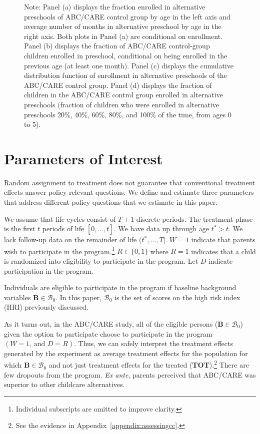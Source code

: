 \begin{figure}
\footnotesize \justify
Note: Panel (a) displays the fraction enrolled in alternative preschools of ABC/CARE control group by age in the left axis and average number of months in alternative preschool by age in the right axis. Both plots in Panel (a) are conditional on enrollment. Panel (b) displays the fraction of ABC/CARE control-group children enrolled in preschool, conditional on being enrolled in the previous age (at least one month). Panel (c) displays the cumulative distribution function of enrollment in alternative preschools of the ABC/CARE control group. Panel (d) displays the fraction of children in the ABC/CARE control group enrolled in alternative preschools (fraction of children who were enrolled in alternative preschools 20\%, 40\%, 60\%, 80\%, and 100\% of the time, from ages 0 to 5). \\
\end{figure}

\section{Parameters of Interest} \label{section:methodsquestions}

Random assignment to treatment does not guarantee that conventional treatment effects answer policy-relevant questions. We define and estimate three parameters that address different policy questions that we estimate in this paper.

We assume that life cycles consist of $T+1$ discrete periods. The treatment phase is the first $\bar{t}$ periods of life $\left[0,\dots,\bar{t}\right]$. We have data up through age $t^{*}>\bar{t}$. We lack follow-up data on the remainder of life $(t^*,\dots,T]$. $W=1$ indicate that parents wish to participate in the program.\footnote{Individual subscripts are omitted to improve clarity.} $R \in \{0,1\}$ where $R=1$ indicates that a child is randomized into eligibility to participate in the program. Let $D$ indicate participation in the program.

Individuals are eligible to participate in the program if baseline background variables $\bm{B}\in\mathcal{B}_0$. In this paper, $\mathcal{B}_0$ is the set of scores on the high risk index (HRI) previously discussed.

As it turns out, in the ABC/CARE study, all of the eligible persons ($\bm{B}\in\mathcal{B}_0$) given the option to participate choose to participate in the program $(W=1\text{, and } D=R)$. Thus, we can safely interpret the treatment effects generated by the experiment as average treatment effects for the population for which $\bm{B}\in\mathcal{B}_0$ and not just treatment effects for the treated (\textbf{TOT}).\footnote{See the evidence in Appendix~\ref{appendix:assessingcc}.} There are few dropouts from the program. \emph{Ex ante}, parents perceived that ABC/CARE was superior to other childcare alternatives.

